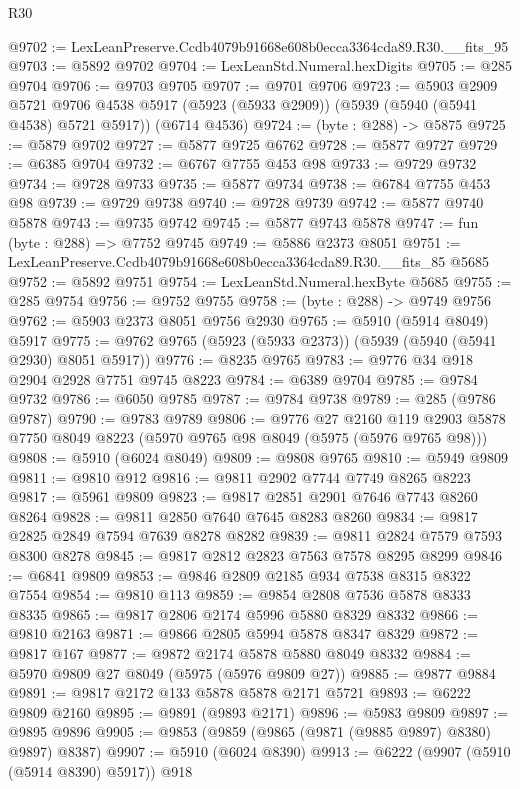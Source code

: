 \begin{lexlean}{R30}
\begin{coremodule}
@9702 := LexLeanPreserve.Ccdb4079b91668e608b0ecca3364cda89.R30.__fits_95
@9703 := @5892 @9702
@9704 := LexLeanStd.Numeral.hexDigits
@9705 := @285 @9704
@9706 := @9703 @9705
@9707 := @9701 @9706
@9723 := @5903
    @2909
    @5721
    @9706
    @4538
    @5917
    (@5923 (@5933 @2909))
    (@5939 (@5940 (@5941 @4538) @5721 @5917))
    (@6714 @4536)
@9724 := (byte : @288) -> @5875
@9725 := @5879 @9702
@9727 := @5877 @9725 @6762
@9728 := @5877 @9727
@9729 := @6385 @9704
@9732 := @6767 @7755 @453 @98
@9733 := @9729 @9732
@9734 := @9728 @9733
@9735 := @5877 @9734
@9738 := @6784 @7755 @453 @98
@9739 := @9729 @9738
@9740 := @9728 @9739
@9742 := @5877 @9740 @5878
@9743 := @9735 @9742
@9745 := @5877 @9743 @5878
@9747 := fun (byte : @288) => @7752 @9745
@9749 := @5886 @2373 @8051
@9751 := LexLeanPreserve.Ccdb4079b91668e608b0ecca3364cda89.R30.__fits_85 @5685
@9752 := @5892 @9751
@9754 := LexLeanStd.Numeral.hexByte @5685
@9755 := @285 @9754
@9756 := @9752 @9755
@9758 := (byte : @288) -> @9749 @9756
@9762 := @5903 @2373 @8051 @9756 @2930
@9765 := @5910 (@5914 @8049) @5917
@9775 := @9762 @9765 (@5923 (@5933 @2373)) (@5939 (@5940 (@5941 @2930) @8051 @5917))
@9776 := @8235 @9765
@9783 := @9776 @34 @918 @2904 @2928 @7751 @9745 @8223
@9784 := @6389 @9704
@9785 := @9784 @9732
@9786 := @6050 @9785
@9787 := @9784 @9738
@9789 := @285 (@9786 @9787)
@9790 := @9783 @9789
@9806 := @9776
    @27
    @2160
    @119
    @2903
    @5878
    @7750
    @8049
    @8223
    (@5970 @9765 @98 @8049 (@5975 (@5976 @9765 @98)))
@9808 := @5910 (@6024 @8049)
@9809 := @9808 @9765
@9810 := @5949 @9809
@9811 := @9810 @912
@9816 := @9811 @2902 @7744 @7749 @8265 @8223
@9817 := @5961 @9809
@9823 := @9817 @2851 @2901 @7646 @7743 @8260 @8264
@9828 := @9811 @2850 @7640 @7645 @8283 @8260
@9834 := @9817 @2825 @2849 @7594 @7639 @8278 @8282
@9839 := @9811 @2824 @7579 @7593 @8300 @8278
@9845 := @9817 @2812 @2823 @7563 @7578 @8295 @8299
@9846 := @6841 @9809
@9853 := @9846 @2809 @2185 @934 @7538 @8315 @8322 @7554
@9854 := @9810 @113
@9859 := @9854 @2808 @7536 @5878 @8333 @8335
@9865 := @9817 @2806 @2174 @5996 @5880 @8329 @8332
@9866 := @9810 @2163
@9871 := @9866 @2805 @5994 @5878 @8347 @8329
@9872 := @9817 @167
@9877 := @9872 @2174 @5878 @5880 @8049 @8332
@9884 := @5970 @9809 @27 @8049 (@5975 (@5976 @9809 @27))
@9885 := @9877 @9884
@9891 := @9817 @2172 @133 @5878 @5878 @2171 @5721
@9893 := @6222 @9809 @2160
@9895 := @9891 (@9893 @2171)
@9896 := @5983 @9809
@9897 := @9895 @9896
@9905 := @9853 (@9859 (@9865 (@9871 (@9885 @9897) @8380) @9897) @8387)
@9907 := @5910 (@6024 @8390)
@9913 := @6222 (@9907 (@5910 (@5914 @8390) @5917)) @918

\end{coremodule}
\end{lexlean}
